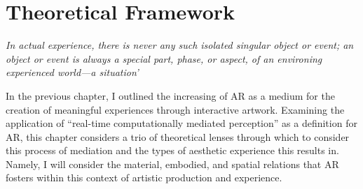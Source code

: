 \chapter{Theoretical Framework}

\epigraph{\emph{In actual experience, there is never any such isolated singular object or event; an object or event is always a special part, phase, or aspect, of an environing experienced world—a situation’}}{\citep[p. 67]{dewey1934}}

In the previous chapter, I outlined the increasing of AR as a medium for the creation of meaningful experiences through interactive artwork. Examining the application of “real-time computationally mediated perception” \citep{kiefer2018} as a definition for AR, this chapter considers a trio of theoretical lenses through which to consider this process of mediation and the types of aesthetic experience this results in. Namely, I will consider the material, embodied, and spatial relations that AR fosters within this context of artistic production and experience.



